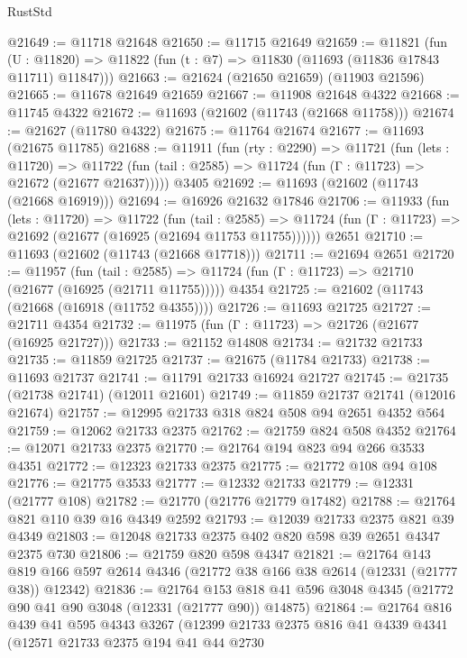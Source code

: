\begin{lexlean}{RustStd}
\begin{coremodule}
@21649 := @11718 @21648
@21650 := @11715 @21649
@21659 := @11821
    (fun (U : @11820) => @11822 (fun (t : @7) => @11830 (@11693 (@11836 @17843 @11711) @11847)))
@21663 := @21624 (@21650 @21659) (@11903 @21596)
@21665 := @11678 @21649 @21659
@21667 := @11908 @21648 @4322
@21668 := @11745 @4322
@21672 := @11693 (@21602 (@11743 (@21668 @11758)))
@21674 := @21627 (@11780 @4322)
@21675 := @11764 @21674
@21677 := @11693 (@21675 @11785)
@21688 := @11911
    (fun (rty : @2290) =>
    @11721
      (fun (lets : @11720) =>
      @11722 (fun (tail : @2585) => @11724 (fun (Γ : @11723) => @21672 (@21677 @21637)))))
    @3405
@21692 := @11693 (@21602 (@11743 (@21668 @16919)))
@21694 := @16926 @21632 @17846
@21706 := @11933
    (fun (lets : @11720) =>
    @11722
      (fun (tail : @2585) =>
      @11724 (fun (Γ : @11723) => @21692 (@21677 (@16925 (@21694 @11753 @11755))))))
    @2651
@21710 := @11693 (@21602 (@11743 (@21668 @17718)))
@21711 := @21694 @2651
@21720 := @11957
    (fun (tail : @2585) => @11724 (fun (Γ : @11723) => @21710 (@21677 (@16925 (@21711 @11755)))))
    @4354
@21725 := @21602 (@11743 (@21668 (@16918 (@11752 @4355))))
@21726 := @11693 @21725
@21727 := @21711 @4354
@21732 := @11975 (fun (Γ : @11723) => @21726 (@21677 (@16925 @21727)))
@21733 := @21152 @14808
@21734 := @21732 @21733
@21735 := @11859 @21725
@21737 := @21675 (@11784 @21733)
@21738 := @11693 @21737
@21741 := @11791 @21733 @16924 @21727
@21745 := @21735 (@21738 @21741) (@12011 @21601)
@21749 := @11859 @21737 @21741 (@12016 @21674)
@21757 := @12995 @21733 @318 @824 @508 @94 @2651 @4352 @564
@21759 := @12062 @21733 @2375
@21762 := @21759 @824 @508 @4352
@21764 := @12071 @21733 @2375
@21770 := @21764 @194 @823 @94 @266 @3533 @4351
@21772 := @12323 @21733 @2375
@21775 := @21772 @108 @94 @108
@21776 := @21775 @3533
@21777 := @12332 @21733
@21779 := @12331 (@21777 @108)
@21782 := @21770 (@21776 @21779 @17482)
@21788 := @21764 @821 @110 @39 @16 @4349 @2592
@21793 := @12039 @21733 @2375 @821 @39 @4349
@21803 := @12048 @21733 @2375 @402 @820 @598 @39 @2651 @4347 @2375 @730
@21806 := @21759 @820 @598 @4347
@21821 := @21764
    @143
    @819
    @166
    @597
    @2614
    @4346
    (@21772 @38 @166 @38 @2614 (@12331 (@21777 @38)) @12342)
@21836 := @21764
    @153
    @818
    @41
    @596
    @3048
    @4345
    (@21772 @90 @41 @90 @3048 (@12331 (@21777 @90)) @14875)
@21864 := @21764
    @816
    @439
    @41
    @595
    @4343
    @3267
    (@12399
      @21733
      @2375
      @816
      @41
      @4339
      @4341
      (@12571
        @21733
        @2375
        @194
        @41
        @44
        @2730

\end{coremodule}
\end{lexlean}
